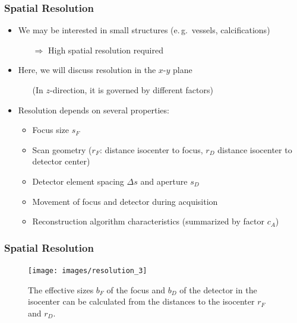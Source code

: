 \begin{frame}
	\frametitle{Spatial Resolution}

	\begin{itemize}
		\setlength\itemsep{0.3cm}
		\item We may be interested in small structures (e.\,g.~vessels, calcifications)
		      \begin{itemize}
			      \item[$\Rightarrow$] High spatial resolution required
		      \end{itemize}
		\item Here, we will discuss resolution in the $x$-$y$ plane
		      \begin{itemize}
			      \item[ ] (In $z$-direction, it is governed by different factors)
		      \end{itemize}
		\item Resolution depends on several properties:
		      \begin{itemize}
			      \item Focus size $s_F$
			      \item Scan geometry ($r_F$: distance isocenter to focus, $r_D$ distance isocenter to detector center)
			      \item Detector element spacing $\Delta s$ and aperture $s_D$
			      \item Movement of focus and detector during acquisition
			      \item Reconstruction algorithm characteristics (summarized by factor $c_A$)
		      \end{itemize}
	\end{itemize}

\end{frame}

\begin{frame}
	\frametitle{Spatial Resolution}

	\begin{figure}
		\begin{center}
			\texttt{[image: images/resolution\_3]}
		\end{center}
		\caption{The effective sizes $b_F$ of the focus and $b_D$ of the detector in the isocenter can be calculated from the distances to the isocenter $r_F$ and $r_D$.}
		\label{fig:ct_resolution_3}
	\end{figure}

\end{frame}



